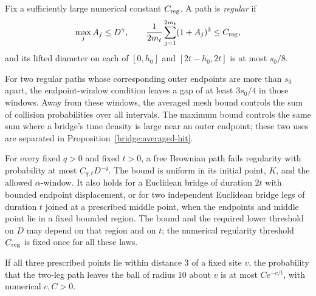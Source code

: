 \begin{definition}\label{path:regular-path}
Fix a sufficiently large numerical constant $C_{\rm reg}$.
A path is \emph{regular} if
\begin{equation}\label{path:regular-conditions}
 \max_j A_j\le D^\gamma,
 \qquad \frac1{2m_t}\sum_{j=1}^{2m_t}(1+A_j)^3\le C_{\rm reg},
\end{equation}
and its lifted diameter on each of $[0,h_0]$ and
$[2t-h_0,2t]$ is at most $s_0/8$.
\end{definition}

For two regular paths whose corresponding outer endpoints are more than
$s_0$ apart, the endpoint-window condition leaves a gap of at least
$3s_0/4$ in those windows.  Away from
these windows, the averaged mesh bound controls the sum of collision
probabilities over all intervals.  The maximum bound controls the same
sum where a bridge's time density is large near an outer endpoint; these
two uses are separated in Proposition~\ref{bridge:averaged-hit}.

\begin{lemma}\label{path:regularity}
For every fixed $q>0$ and fixed $t>0$, a free Brownian path fails
regularity with probability at most $C_{q,t}D^{-q}$.
The bound is uniform in its initial point, $K$, and the allowed
$\alpha$-window.  It also holds for a Euclidean bridge of duration
$2t$ with bounded endpoint displacement, or for two independent
Euclidean bridge legs of duration $t$ joined at a prescribed middle
point, when the endpoints and middle point lie in a fixed bounded
region.  The bound and the required lower threshold on $D$ may depend on
that region and on $t$; the numerical regularity threshold $C_{\rm reg}$
is fixed once for all these laws.

If all three prescribed points lie within distance $3$ of a fixed
site $v$, the probability that the two-leg path leaves the ball of
radius $10$ about $v$ is at most $Ce^{-c/t}$, with numerical $c,C>0$.
\end{lemma}

